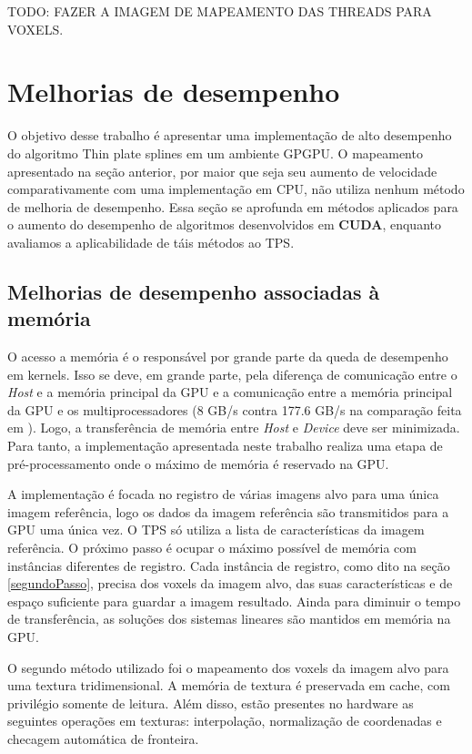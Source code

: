   TODO: FAZER A IMAGEM DE MAPEAMENTO DAS THREADS PARA VOXELS.

\section{Melhorias de desempenho}

  O objetivo desse trabalho é apresentar uma implementação de alto desempenho
do algoritmo Thin plate splines em um ambiente GPGPU. O mapeamento apresentado
na seção anterior, por maior que seja seu aumento de velocidade comparativamente
com uma implementação em CPU, não utiliza nenhum método de melhoria de desempenho.
Essa seção se aprofunda em métodos aplicados para o aumento do desempenho de
algoritmos desenvolvidos em \textbf{CUDA}, enquanto avaliamos a aplicabilidade
de táis métodos ao TPS.

\subsection{Melhorias de desempenho associadas à memória}

O acesso a memória é o responsável por grande parte da queda de desempenho
em kernels. Isso se deve, em grande parte, pela diferença de comunicação entre o
\textit{Host} e a memória principal da GPU e a comunicação entre a memória
principal da GPU e os multiprocessadores
(8 GB/s contra 177.6 GB/s na comparação feita em \cite{cudaBestPractices}). Logo,
a transferência de memória entre \textit{Host} e \textit{Device} deve ser
minimizada. Para tanto, a implementação apresentada neste trabalho realiza uma
etapa de pré-processamento onde o máximo de memória é reservado na GPU.

A implementação é focada no registro de várias imagens alvo para uma única
imagem referência, logo os dados da imagem referência são transmitidos para a
GPU uma única vez. O TPS só utiliza a lista de características da imagem referência.
O próximo passo é ocupar o máximo possível de memória com instâncias diferentes
de registro. Cada instância de registro, como dito na seção \ref{segundoPasso},
precisa dos voxels da imagem alvo, das suas características e de espaço suficiente
para guardar a imagem resultado. Ainda para diminuir o tempo de transferência,
as soluções dos sistemas lineares são mantidos em memória na GPU.

O segundo método utilizado foi o mapeamento dos voxels da imagem alvo para uma
textura tridimensional. A memória de textura é preservada em cache, com privilégio
somente de leitura. Além disso, estão presentes no hardware as seguintes operações
em texturas: interpolação, normalização de coordenadas e checagem automática de
fronteira.

